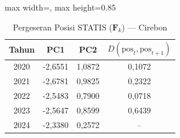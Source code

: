 \begin{table}[H]
\centering
\caption{Pergeseran Posisi STATIS ($\mathbf{F}_k$) --- Cirebon} \label{tab:app2jarak_statis_skor_cirebon}
\begin{adjustbox}{max width=\textwidth, max height=0.85\textheight}
\begin{tabular}{|c|c|c|c|}
\hline
\textbf{Tahun} & \textbf{PC1} & \textbf{PC2} & \textbf{$D(\text{pos}_t, \text{pos}_{t+1})$} \\
\hline
2020 & -2,6551 & 1,0872 & 0,1072 \\
2021 & -2,6781 & 0,9825 & 0,2322 \\
2022 & -2,5483 & 0,7900 & 0,0718 \\
2023 & -2,5647 & 0,8599 & 0,6439 \\
2024 & -2,3380 & 0,2572 & -- \\
\hline
\end{tabular}
\end{adjustbox}
\end{table}